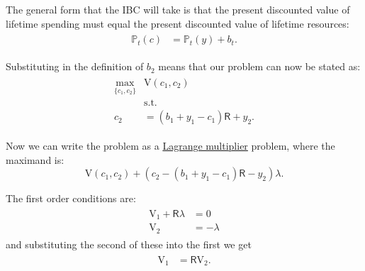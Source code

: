 \documentclass{scrartcl}
\begin{document}
  The general form that the IBC will take is that the present discounted value of lifetime spending must equal the present discounted value of lifetime resources:
  \begin{equation}\begin{gathered}\begin{aligned} {\mathbb{P}}_{t}(\boldsymbol{\mathit{c}}) & = {\mathbb{P}}_{t}(y)+\boldsymbol{\mathit{b}}_{t}. \label{eq:ibcgen}
      \end{aligned}\end{gathered}\end{equation}

  Substituting in the definition of $\boldsymbol{\mathit{b}}_{2}$ means that our problem can now be stated as:
  \begin{equation}\begin{gathered}\begin{aligned} \max_{\{\boldsymbol{\mathit{c}}_{1},\boldsymbol{\mathit{c}}_{2}\}} & \mathrm{V}(\boldsymbol{\mathit{c}}_{1},\boldsymbol{\mathit{c}}_{2}) \\ & \mbox{s.t.}  \nonumber \\ \boldsymbol{\mathit{c}}_{2} & = (\boldsymbol{\mathit{b}}_{1}+\boldsymbol{\mathit{y}}_{1}-\boldsymbol{\mathit{c}}_{1})\mathsf{R}+\boldsymbol{\mathit{y}}_{2}.
      \end{aligned}\end{gathered}\end{equation}

  Now we can write the problem as a \href{https://en.wikipedia.org/wiki/Lagrange_multiplier}{Lagrange multiplier} problem, where the maximand is:
  \begin{equation} \mathrm{V}(\boldsymbol{\mathit{c}}_{1},\boldsymbol{\mathit{c}}_{2}) + \left( \boldsymbol{\mathit{c}}_{2}- (\boldsymbol{\mathit{b}}_{1}+\boldsymbol{\mathit{y}}_{1}-\boldsymbol{\mathit{c}}_{1})\mathsf{R}-\boldsymbol{\mathit{y}}_{2}\right)\lambda.
  \end{equation}

  The first order conditions are:
  \begin{equation}\begin{gathered}\begin{aligned} \mathrm{V}_{1} + \mathsf{R}\lambda & = 0 \label{eq:lagrange1}\\ \mathrm{V}_{2} & = -\lambda
      \end{aligned}\end{gathered}\end{equation} and substituting the second of these into the first we get
  \begin{equation}\begin{gathered}\begin{aligned} \mathrm{V}_{1} & = \mathsf{R} \mathrm{V}_{2} \label{eq:timeprice}.
      \end{aligned}\end{gathered}\end{equation}
\end{document}
